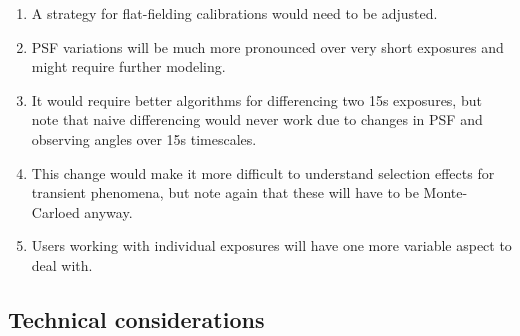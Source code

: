 \documentclass[12pt, a4paper]{article}
\begin{document}
\begin{enumerate}

\item A strategy for flat-fielding calibrations would need to be
  adjusted.

\item PSF variations will be much more pronounced over very short
  exposures and might require further modeling. 

\item It would require better algorithms for differencing two 15s
  exposures, but note that naive differencing would never work due to
  changes in PSF and observing angles over 15s timescales.

\item This change would make it more difficult to understand selection
  effects for transient phenomena, but note again that these will have
  to be Monte-Carloed anyway.

\item Users working with individual exposures will have one more
  variable aspect to deal with.

\end{enumerate}

\subsection*{Technical considerations}
\end{document}
